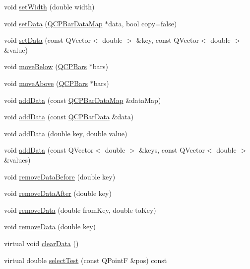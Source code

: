 \begin{DoxyCompactItemize}
\item 
void \hyperlink{classQCPBars_afec6116579d44d5b706e0fa5e5332507}{set\-Width} (double width)
\item 
void \hyperlink{classQCPBars_aa3435aab19e0a49e4e7b41bd36a8d96b}{set\-Data} (\hyperlink{qcustomplot_8h_aa846c77472cae93def9f1609d0c57191}{Q\-C\-P\-Bar\-Data\-Map} $\ast$data, bool copy=false)
\item 
void \hyperlink{classQCPBars_a3efded5df4a82ecb201f7c28099fa2e5}{set\-Data} (const Q\-Vector$<$ double $>$ \&key, const Q\-Vector$<$ double $>$ \&value)
\item 
void \hyperlink{classQCPBars_a69fc371346980f19177c3d1ecdad78ee}{move\-Below} (\hyperlink{classQCPBars}{Q\-C\-P\-Bars} $\ast$bars)
\item 
void \hyperlink{classQCPBars_ac22e00a6a41509538c21b04f0a57318c}{move\-Above} (\hyperlink{classQCPBars}{Q\-C\-P\-Bars} $\ast$bars)
\item 
void \hyperlink{classQCPBars_a1f29cf08615040993209147fa68de3f2}{add\-Data} (const \hyperlink{qcustomplot_8h_aa846c77472cae93def9f1609d0c57191}{Q\-C\-P\-Bar\-Data\-Map} \&data\-Map)
\item 
void \hyperlink{classQCPBars_a142158b1addefd53259002dd3ab22c3a}{add\-Data} (const \hyperlink{classQCPBarData}{Q\-C\-P\-Bar\-Data} \&data)
\item 
void \hyperlink{classQCPBars_a684dd105403a5497fda42f2094fecbb7}{add\-Data} (double key, double value)
\item 
void \hyperlink{classQCPBars_a3679a0a9decab0fa03f8f4c6e3344d52}{add\-Data} (const Q\-Vector$<$ double $>$ \&keys, const Q\-Vector$<$ double $>$ \&values)
\item 
void \hyperlink{classQCPBars_a9d12779a3fad4820aad2c428f368298d}{remove\-Data\-Before} (double key)
\item 
void \hyperlink{classQCPBars_a99de6e7abbbf03fb41fa604c7f08aa8b}{remove\-Data\-After} (double key)
\item 
void \hyperlink{classQCPBars_a1fe9bcb57d670defea1bb65cadf43765}{remove\-Data} (double from\-Key, double to\-Key)
\item 
void \hyperlink{classQCPBars_a837cc9848ad3edd40a6130b508493f93}{remove\-Data} (double key)
\item 
virtual void \hyperlink{classQCPBars_a11dbbd707132f07f862dff13c5789c2b}{clear\-Data} ()
\item 
virtual double \hyperlink{classQCPBars_a3b4aeb6d87d57dce496f5f83c21eabba}{select\-Test} (const Q\-Point\-F \&pos) const 
\end{DoxyCompactItemize}
